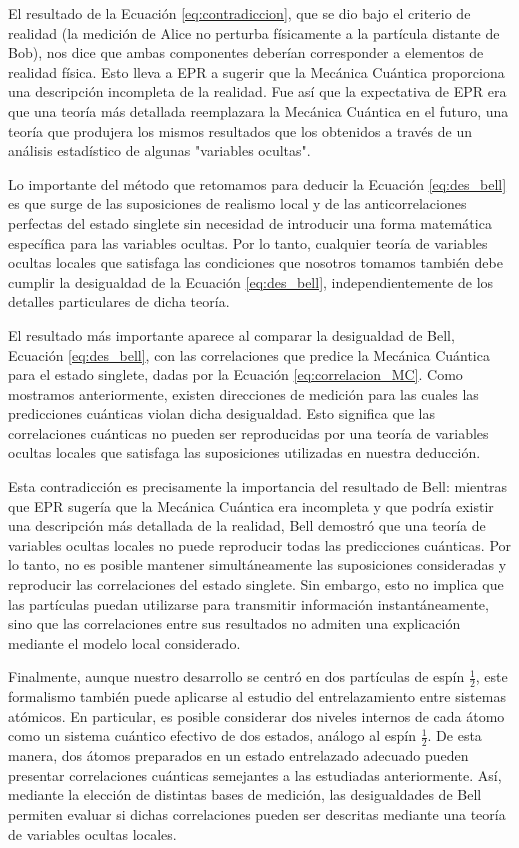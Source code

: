 El resultado de la Ecuación \ref{eq:contradiccion}, que se dio bajo el criterio de realidad (la medición de Alice no perturba físicamente a la partícula distante de Bob), nos dice que ambas componentes deberían corresponder a elementos de realidad física. Esto lleva a EPR a sugerir que la Mecánica Cuántica proporciona una descripción incompleta de la realidad. \cite{EPR} Fue así que la expectativa de EPR era que una teoría más detallada reemplazara la Mecánica Cuántica en el futuro, una teoría que produjera los mismos resultados que los obtenidos a través de un análisis estadístico de algunas "variables ocultas".
 
Lo importante del método que retomamos para deducir la Ecuación \ref{eq:des_bell} es que surge de las suposiciones de realismo local y de las anticorrelaciones perfectas del estado singlete sin necesidad de introducir una forma matemática específica para las variables ocultas. Por lo tanto, cualquier teoría de variables ocultas locales que satisfaga las condiciones que nosotros tomamos también debe cumplir la desigualdad de la Ecuación \ref{eq:des_bell}, independientemente de los detalles particulares de dicha teoría.

El resultado más importante aparece al comparar la desigualdad de Bell, Ecuación \ref{eq:des_bell}, con las correlaciones que predice la Mecánica Cuántica para el estado singlete, dadas por la Ecuación \ref{eq:correlacion_MC}. Como mostramos anteriormente, existen direcciones de medición para las cuales las predicciones cuánticas violan dicha desigualdad. Esto significa que las correlaciones cuánticas no pueden ser reproducidas por una teoría de variables ocultas locales que satisfaga las suposiciones utilizadas en nuestra deducción. \cite{Bell}

Esta contradicción es precisamente la importancia del resultado de Bell: mientras que EPR sugería que la Mecánica Cuántica era incompleta y que podría existir una descripción más detallada de la realidad, Bell demostró que una teoría de variables ocultas locales no puede reproducir todas las predicciones cuánticas. Por lo tanto, no es posible mantener simultáneamente las suposiciones consideradas y reproducir las correlaciones del estado singlete. Sin embargo, esto no implica que las partículas puedan utilizarse para transmitir información instantáneamente, sino que las correlaciones entre sus resultados no admiten una explicación mediante el modelo local considerado.


Finalmente, aunque nuestro desarrollo se centró en dos partículas de espín $\frac{1}{2}$, este formalismo también puede aplicarse al estudio del entrelazamiento entre sistemas atómicos. En particular, es posible considerar dos niveles internos de cada átomo como un sistema cuántico efectivo de dos estados, análogo al espín $\frac{1}{2}$. De esta manera, dos átomos preparados en un estado entrelazado adecuado pueden presentar correlaciones cuánticas semejantes a las estudiadas anteriormente. Así, mediante la elección de distintas bases de medición, las desigualdades de Bell permiten evaluar si dichas correlaciones pueden ser descritas mediante una teoría de variables ocultas locales.
